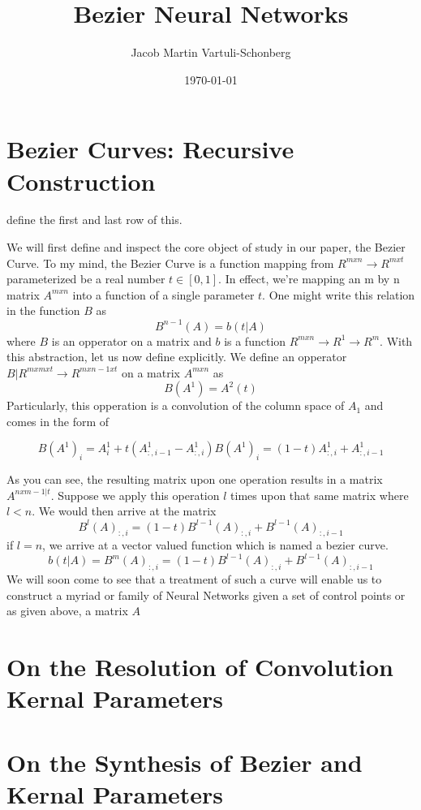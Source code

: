 \documentclass{article}
\title{Bezier Neural Networks}
\author{Jacob Martin Vartuli-Schonberg}
\date{\today}
\begin{document}
\maketitle
\tableofcontents
\newpage

\section{Bezier Curves: Recursive Construction}

define the first and last row of this.

We will first define and inspect the core object of study in our paper, the Bezier Curve. To my mind,
the Bezier Curve is a function mapping from \( R^{m x n} \to R^{m x t} \) parameterized be a real number \(t \in [0,1]\).
In effect, we're mapping an m by n matrix \(A^{m x n}\) into a function of a single parameter \(t\). One might write this
relation in the function \(B\) as
\begin{equation} \label{1} B^{n-1}(A) = b(t|A) \end{equation}
where \(B\) is an opperator on a matrix and \(b\) is a function \( R^{m x n} \to R^{1} \to R^{m} \). With this abstraction, 
let us now define explicitly. We define an opperator \(B | R^{m x m x t} \to R^{m x {n-1 x t}}\) on a matrix \(A^{m x n}\) as 
\begin{equation} B(A^1) = A^2(t) \end{equation}
Particularly, this opperation is a convolution of the column space of \(A_1\) and comes in the form of

\begin{subequations}
  \begin{equation}
    B(A^1)_i = A^1_i + t(A^1_{:,i-1} - A^1_{:,i})
  \end{equation}
  \begin{equation}
    B(A^1)_i = (1 - t)A^1_{:,i} + A^1_{:,i-1}
  \end{equation}
\end{subequations}

As you can see, the resulting matrix upon one operation results in a matrix \(A^{nxm-1|t} \). Suppose we apply this operation
\(l\) times upon that same matrix where \(l < n\). We would then arrive at the matrix 
\begin{equation}
  B^l(A)_{:, i} = (1-t)B^{l-1}(A)_{:,i} + B^{l-1}(A)_{:,i-1}
\end{equation}
if \(l = n\), we arrive at a vector valued function which is named a bezier curve.
\begin{equation}
  b(t|A) = B^m(A)_{:, i} = (1-t)B^{l-1}(A)_{:,i} + B^{l-1}(A)_{:,i-1}
\end{equation}
We will soon come to see that a treatment of such a curve will enable us to construct a myriad or family of Neural Networks
given a set of control points or as given above, a matrix \(A\)

\section{On the Resolution of Convolution Kernal Parameters}
\section{On the Synthesis of Bezier and Kernal Parameters}
\end{document}
